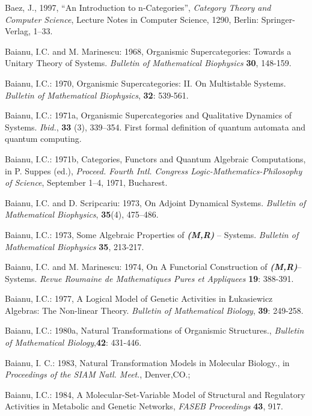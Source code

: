 \documentclass[12pt]{article}
\begin{document}
\begin{thebibliography}{399}
Baez, J., 1997, ``An Introduction to n-Categories'', {\em Category Theory and Computer Science}, Lecture Notes in Computer Science, 1290, Berlin: Springer-Verlag, 1--33. 

Baianu, I.C. and M. Marinescu: 1968, Organismic Supercategories: Towards a Unitary Theory of Systems. \emph{Bulletin of Mathematical Biophysics} \textbf{30}, 148-159.

Baianu, I.C.: 1970, Organismic Supercategories: II. On Multistable Systems. \emph{Bulletin of Mathematical Biophysics}, \textbf{32}: 539-561.

Baianu, I.C.: 1971a, Organismic Supercategories and Qualitative Dynamics of Systems. \emph{Ibid.}, \textbf{33} (3), 339--354. First formal definition of quantum automata and quantum computing.
 
Baianu, I.C.: 1971b, Categories, Functors and Quantum Algebraic Computations, in P. Suppes (ed.), \emph{Proceed. Fourth Intl. Congress Logic-Mathematics-Philosophy of Science}, September 1--4, 1971, Bucharest.

Baianu, I.C. and D. Scripcariu: 1973, On Adjoint Dynamical Systems. \emph{Bulletin of Mathematical Biophysics}, \textbf{35}(4), 475--486.

Baianu, I.C.: 1973, Some Algebraic Properties of \emph{\textbf{(M,R)}} -- Systems. \emph{Bulletin of Mathematical Biophysics} \textbf{35}, 213-217.

Baianu, I.C. and M. Marinescu: 1974, On A Functorial Construction of \emph{\textbf{(M,R)}}-- Systems. \emph{Revue Roumaine de Mathematiques Pures et Appliquees} \textbf{19}: 388-391.

Baianu, I.C.: 1977, A Logical Model of Genetic Activities in \L{}ukasiewicz Algebras: The Non-linear Theory. \emph{Bulletin of Mathematical Biology},
\textbf{39}: 249-258.

Baianu, I.C.: 1980a, Natural Transformations of Organismic Structures.,
\emph{Bulletin of Mathematical Biology},\textbf{42}: 431-446.

Baianu, I. C.: 1983, Natural Transformation Models in Molecular
Biology., in \emph{Proceedings of the SIAM Natl. Meet}., Denver,CO.; 

Baianu, I.C.: 1984, A Molecular-Set-Variable Model of Structural and Regulatory Activities in Metabolic and Genetic Networks, \emph{FASEB Proceedings} \textbf{43}, 917.


\end{thebibliography}
\end{document}
